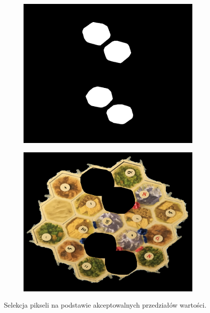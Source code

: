 \documentclass[a4paper]{article}
\begin{document}
\begin{figure}[H]
\begin{subfigure}[]{0.5\linewidth}
        \end{subfigure}
		\begin{subfigure}[]{0.5\linewidth}
        \includegraphics[width=\linewidth]{pictures/fields/convex.png}
        \end{subfigure}
        \begin{subfigure}[]{0.5\linewidth}
        \includegraphics[width=\linewidth]{pictures/fields/delete_convex.png}
        \end{subfigure}
        \caption{ Selekcja pikseli na podstawie akceptowalnych przedziałów wartości.}
        \label{fig:step4}
    \end{figure}
	
\end{document}
